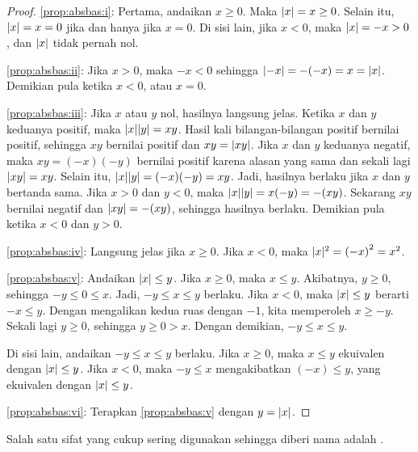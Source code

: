 \begin{proof}
\ref{prop:absbas:i}:
Pertama, andaikan $x \geq 0$.
Maka $\lvert {x} \rvert = x \geq 0$.  Selain itu, $\lvert {x} \rvert = x = 0$ jika dan hanya
jika $x=0$.
Di sisi lain, jika $x < 0$, maka $\lvert {x} \rvert = -x > 0$, dan $\lvert {x} \rvert$ tidak pernah nol.

\medskip

\ref{prop:absbas:ii}: Jika $x > 0$, maka $-x < 0$ sehingga $\lvert {-x} \rvert = -(-x) = x =
\lvert {x} \rvert$.  Demikian pula ketika $x < 0$, atau $x = 0$.

\medskip

\ref{prop:absbas:iii}:
Jika $x$ atau $y$ nol, hasilnya langsung jelas.  Ketika $x$ dan
$y$ keduanya positif, maka $\lvert {x} \rvert\lvert {y} \rvert = xy$.  Hasil kali bilangan-bilangan
positif bernilai positif, sehingga $xy$ bernilai
positif dan $xy = \lvert {xy} \rvert$.
Jika $x$ dan $y$ keduanya negatif,
maka $xy=(-x)(-y)$ bernilai positif karena alasan yang sama dan sekali lagi $\lvert {xy} \rvert=xy$.  Selain itu,
$\lvert {x} \rvert\lvert {y} \rvert = (-x)(-y) = xy$.
Jadi, hasilnya berlaku jika $x$ dan $y$ bertanda sama.
Jika $x > 0$ dan $y < 0$, maka $\lvert {x} \rvert\lvert {y} \rvert = x(-y) = -(xy)$.  Sekarang
$xy$ bernilai negatif dan $\lvert {xy} \rvert = -(xy)$, sehingga hasilnya berlaku.  Demikian pula ketika
$x < 0$ dan $y > 0$.

\medskip

\ref{prop:absbas:iv}:
Langsung jelas jika $x \geq 0$.  Jika $x < 0$, maka $\lvert {x} \rvert^2 = {(-x)}^2 =
x^2$.

\medskip

\ref{prop:absbas:v}:
Andaikan $\lvert {x} \rvert \leq y$.
Jika $x \geq 0$, maka $x \leq y$.
Akibatnya, $y \geq 0$, sehingga $-y \leq 0 \leq x$.
Jadi, $-y \leq x \leq y$ berlaku.
Jika $x < 0$, maka $\lvert {x} \rvert \leq y$ berarti $-x \leq y$.
Dengan mengalikan kedua ruas dengan $-1$, kita memperoleh $x \geq -y$.
Sekali lagi $y \geq 0$, sehingga $y \geq 0 > x$.
Dengan demikian, $-y \leq x \leq y$.

Di sisi lain, andaikan $-y \leq x \leq y$ berlaku.
Jika $x \geq 0$, maka $x \leq y$ ekuivalen dengan $\lvert {x} \rvert \leq y$.
Jika $x < 0$, maka $-y \leq x$ mengakibatkan $(-x) \leq y$,
yang ekuivalen dengan $\lvert {x} \rvert \leq y$.

\medskip

\ref{prop:absbas:vi}:
Terapkan \ref{prop:absbas:v} dengan $y = \lvert {x} \rvert$.
\end{proof}

Salah satu sifat yang cukup sering digunakan sehingga diberi nama adalah
\emph{}.

